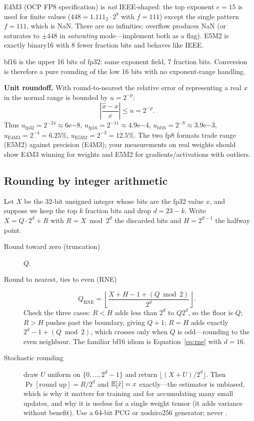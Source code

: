 E4M3 (OCP FP8 specification) is \emph{not} IEEE-shaped: the top exponent $e=15$ is used for finite values ($448 = 1.111_2 \cdot 2^{8}$ with $f=111$) except the single pattern $f=111$, which is NaN. There are no infinities; overflow produces NaN (or saturates to $\pm 448$ in \emph{saturating} mode---implement both as a flag). E5M2 is exactly binary16 with 8 fewer fraction bits and behaves like IEEE.

bf16 is the upper 16 bits of fp32: same exponent field, 7 fraction bits. Conversion is therefore a pure rounding of the low 16 bits with no exponent-range handling.

\textbf{Unit roundoff.} With round-to-nearest the relative error of representing a real $x$ in the normal range is bounded by $u = 2^{-p}$:
\begin{equation}
\left|\frac{\hat{x}-x}{x}\right| \le u = 2^{-p}.
\end{equation}
Thus $u_{\text{fp32}}=2^{-24}\approx 6\mathrm{e}{-8}$, $u_{\text{fp16}}=2^{-11}\approx 4.9\mathrm{e}{-4}$, $u_{\text{bf16}}=2^{-8}\approx 3.9\mathrm{e}{-3}$, $u_{\text{E4M3}}=2^{-4}=6.25\%$, $u_{\text{E5M2}}=2^{-3}=12.5\%$. The two fp8 formats trade range (E5M2) against precision (E4M3); your measurements on real weights should show E4M3 winning for weights and E5M2 for gradients/activations with outliers.

\subsection{Rounding by integer arithmetic}

Let $X$ be the 32-bit unsigned integer whose bits are the fp32 value $x$, and suppose we keep the top $k$ fraction bits and drop $d = 23 - k$. Write $X = Q\cdot 2^d + R$ with $R = X \bmod 2^d$ the discarded bits and $H = 2^{d-1}$ the halfway point.

\begin{description}
  \item[Round toward zero (truncation)] $Q$.
  \item[Round to nearest, ties to even (RNE)]
  \begin{equation}
    Q_{\text{RNE}} = \left\lfloor \frac{X + H - 1 + (Q \bmod 2)}{2^d} \right\rfloor .
    \label{eq:rne}
  \end{equation}
  Check the three cases: $R<H$ adds less than $2^d$ to $Q2^d$, so the floor is $Q$; $R>H$ pushes past the boundary, giving $Q+1$; $R=H$ adds exactly $2^d - 1 + (Q\bmod 2)$, which crosses only when $Q$ is odd---rounding to the even neighbour. The familiar bf16 idiom  is Equation~\eqref{eq:rne} with $d=16$.
  \item[Stochastic rounding] draw $U$ uniform on $\{0,\dots,2^d-1\}$ and return $\lfloor (X+U)/2^d \rfloor$. Then $\Pr[\text{round up}] = R/2^d$ and $\mathbb{E}[\hat{x}] = x$ exactly---the estimator is unbiased, which is why it matters for training and for accumulating many small updates, and why it is useless for a single weight tensor (it adds variance without benefit). Use a 64-bit PCG or xoshiro256 generator; never .
\end{description}

